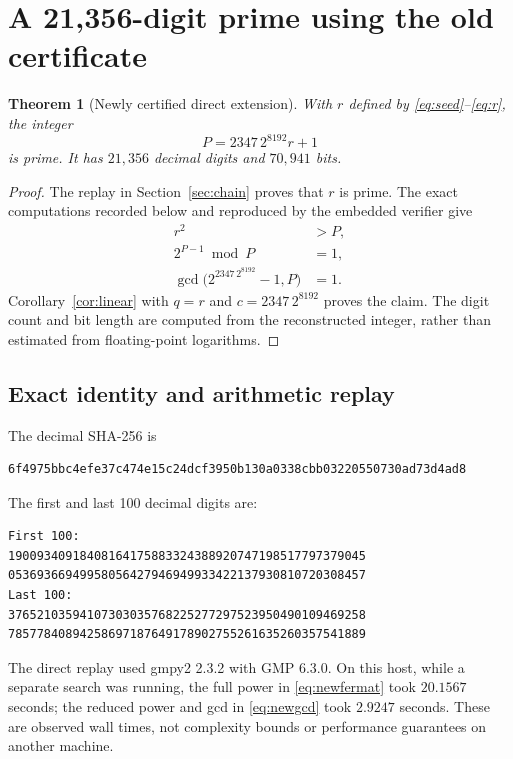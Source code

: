 \documentclass[11pt,a4paper]{article}
\newtheorem{theorem}{Theorem}[section]
\theoremstyle{definition}\newtheorem{definition}[theorem]{Definition}
\theoremstyle{remark}\newtheorem{remark}[theorem]{Remark}
\begin{document}
\section{A 21,356-digit prime using the old certificate}\label{sec:newprime}
\begin{theorem}[Newly certified direct extension]\label{thm:newprime}
With $r$ defined by \eqref{eq:seed}--\eqref{eq:r}, the integer
\begin{equation}\label{eq:newprime}
 \boxed{P=2347\,2^{8192}r+1}
\end{equation}
is prime. It has $21,356$ decimal digits and $70,941$ bits.
\end{theorem}
\begin{proof}
The replay in Section~\ref{sec:chain} proves that $r$ is prime.
The exact computations recorded below and reproduced by the embedded
verifier give
\begin{align}
 r^2&>P,\label{eq:newsize}\\
 2^{P-1}\bmod P&=1,\label{eq:newfermat}\\
 \gcd\bigl(2^{2347\,2^{8192}}-1,P\bigr)&=1.\label{eq:newgcd}
\end{align}
Corollary~\ref{cor:linear} with $q=r$ and $c=2347\,2^{8192}$ proves the
claim. The digit count and bit length are computed from the reconstructed
integer, rather than estimated from floating-point logarithms.
\end{proof}

\subsection{Exact identity and arithmetic replay}
The decimal SHA-256 is
\begin{lstlisting}[numbers=none]
6f4975bbc4efe37c474e15c24dcf3950b130a0338cbb03220550730ad73d4ad8
\end{lstlisting}
The first and last 100 decimal digits are:
\begin{lstlisting}[numbers=none]
First 100:
19009340918408164175883324388920747198517797379045
05369366949958056427946949933422137930810720308457
Last 100:
37652103594107303035768225277297523950490109469258
78577840894258697187649178902755261635260357541889
\end{lstlisting}
The direct replay used gmpy2 2.3.2 with GMP 6.3.0. On this host, while a
separate search was running, the full power in \eqref{eq:newfermat} took
$20.1567$ seconds; the reduced power and gcd in \eqref{eq:newgcd} took
$2.9247$ seconds. These are observed wall times, not complexity bounds or
performance guarantees on another machine.
\end{document}
